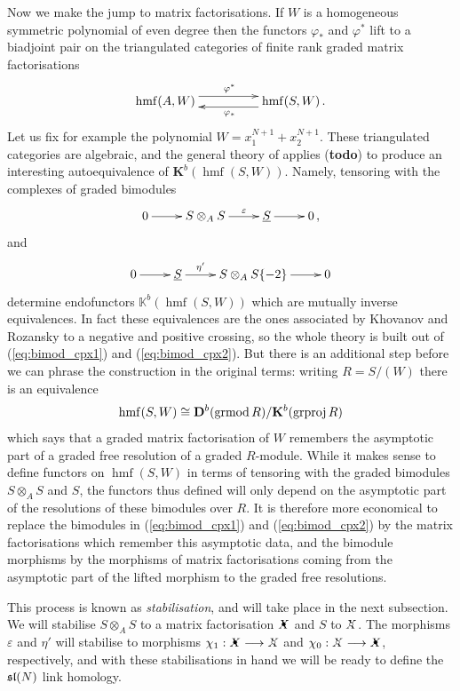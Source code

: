 \documentclass{compositio}
\theoremstyle{definition}
\numberwithin{equation}{section}
\def\K{\mathbf{K}}
\DeclareMathOperator{\hmf}{hmf}
\begin{document}
Now we make the jump to matrix factorisations. If $W$ is a homogeneous symmetric polynomial of even degree then the functors $\varphi_*$ and $\varphi^*$ lift to a biadjoint pair on the triangulated categories of finite rank graded matrix factorisations
\[
\xymatrix@C+2pc{
\hmf(A, W) \ar@<1ex>[r]^{\varphi^*} & \hmf(S, W) \ar@<1ex>[l]^{\varphi_*} \, .
}
\]
Let us fix for example the polynomial $W = x_1^{N+1} + x_2^{N+1}$. These triangulated categories are algebraic, and the general theory of \cite{RouquierMexico} applies (\textbf{todo}) to produce an interesting autoequivalence of $\K^b( \hmf(S, W) )$. Namely, tensoring with the complexes of graded bimodules
\begin{equation}\label{eq:bimod_cpx1}
\xymatrix{
0 \ar[r] & S \otimes_A S \ar[r]^-{\varepsilon} & \underline{S} \ar[r] & 0 \, ,
}
\end{equation}
and
\begin{equation}\label{eq:bimod_cpx2}
\xymatrix{
0 \ar[r] & \underline{S} \ar[r]^-{\eta'} & S \otimes_A S\{-2\} \ar[r] & 0
}
\end{equation}
determine endofunctors $\mathbb{K}^b( \hmf(S, W) )$ which are mutually inverse equivalences. In fact these equivalences are the ones associated by Khovanov and Rozansky to a negative and positive crossing, so the whole theory is built out of (\ref{eq:bimod_cpx1}) and (\ref{eq:bimod_cpx2}). But there is an additional step before we can phrase the construction in the original terms: writing $R = S/(W)$ there is an equivalence
\[
\hmf(S, W) \cong \qderu{b}{\textup{grmod}\, R}/\K^b(\textup{grproj}\, R)
\]
which says that a graded matrix factorisation of $W$ remembers the asymptotic part of a graded free resolution of a graded $R$-module. While it makes sense to define functors on $\hmf(S,W)$ in terms of tensoring with the graded bimodules $S \otimes_A S$ and $S$, the functors thus defined will only depend on the asymptotic part of the resolutions of these bimodules over $R$. It is therefore more economical to replace the bimodules in (\ref{eq:bimod_cpx1}) and (\ref{eq:bimod_cpx2}) by the matrix factorisations which remember this asymptotic data, and the bimodule morphisms by the morphisms of matrix factorisations coming from the asymptotic part of the lifted morphism to the graded free resolutions.

This process is known as \emph{stabilisation}, and will take place in the next subsection. We will stabilise $S \otimes_A S$ to a matrix factorisation $\Xbul$ and $S$ to $\Xcirc$. The morphisms $\varepsilon$ and $\eta'$ will stabilise to morphisms $\chi_1: \Xbul \lto \Xcirc$ and $\chi_0: \Xcirc \lto \Xbul$, respectively, and with these stabilisations in hand we will be ready to define the $\mathfrak{sl}(N)$ link homology.
\end{document}
